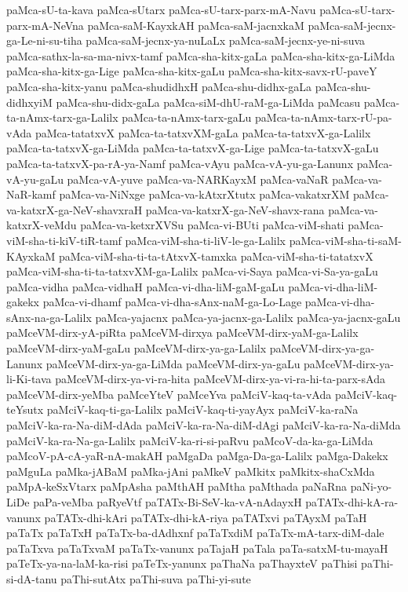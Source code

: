 {paMca-sU-ta-kava
paMca-sUtarx
paMca-sU-tarx-parx-mA-Navu
paMca-sU-tarx-parx-mA-NeVna
paMca-saM-KayxkAH
paMca-saM-jacnxkaM
paMca-saM-jecnx-ga-Le-ni-su-tiha
paMca-saM-jecnx-ya-nuLaLx
paMca-saM-jecnx-ye-ni-suva
paMca-sathx-la-sa-ma-nivx-tamf
paMca-sha-kitx-gaLa
paMca-sha-kitx-ga-LiMda
paMca-sha-kitx-ga-Lige
paMca-sha-kitx-gaLu
paMca-sha-kitx-savx-rU-paveY
paMca-sha-kitx-yanu
paMca-shudidhxH
paMca-shu-didhx-gaLa
paMca-shu-didhxyiM
paMca-shu-didx-gaLa
paMca-siM-dhU-raM-ga-LiMda
paMcasu
paMca-ta-nAmx-tarx-ga-Lalilx
paMca-ta-nAmx-tarx-gaLu
paMca-ta-nAmx-tarx-rU-pa-vAda
paMca-tatatxvX
paMca-ta-tatxvXM-gaLa
paMca-ta-tatxvX-ga-Lalilx
paMca-ta-tatxvX-ga-LiMda
paMca-ta-tatxvX-ga-Lige
paMca-ta-tatxvX-gaLu
paMca-ta-tatxvX-pa-rA-ya-Namf
paMca-vAyu
paMca-vA-yu-ga-Lanunx
paMca-vA-yu-gaLu
paMca-vA-yuve
paMca-va-NARKayxM
paMca-vaNaR
paMca-va-NaR-kamf
paMca-va-NiNxge
paMca-va-kAtxrXtutx
paMca-vakatxrXM
paMca-va-katxrX-ga-NeV-shavxraH
paMca-va-katxrX-ga-NeV-shavx-rana
paMca-va-katxrX-veMdu
paMca-va-ketxrXVSu
paMca-vi-BUti
paMca-viM-shati
paMca-viM-sha-ti-kiV-tiR-tamf
paMca-viM-sha-ti-liV-le-ga-Lalilx
paMca-viM-sha-ti-saM-KAyxkaM
paMca-viM-sha-ti-ta-tAtxvX-tamxka
paMca-viM-sha-ti-tatatxvX
paMca-viM-sha-ti-ta-tatxvXM-ga-Lalilx
paMca-vi-Saya
paMca-vi-Sa-ya-gaLu
paMca-vidha
paMca-vidhaH
paMca-vi-dha-liM-gaM-gaLu
paMca-vi-dha-liM-gakekx
paMca-vi-dhamf
paMca-vi-dha-sAnx-naM-ga-Lo-Lage
paMca-vi-dha-sAnx-na-ga-Lalilx
paMca-yajacnx
paMca-ya-jacnx-ga-Lalilx
paMca-ya-jacnx-gaLu
paMceVM-dirx-yA-piRta
paMceVM-dirxya
paMceVM-dirx-yaM-ga-Lalilx
paMceVM-dirx-yaM-gaLu
paMceVM-dirx-ya-ga-Lalilx
paMceVM-dirx-ya-ga-Lanunx
paMceVM-dirx-ya-ga-LiMda
paMceVM-dirx-ya-gaLu
paMceVM-dirx-ya-li-Ki-tava
paMceVM-dirx-ya-vi-ra-hita
paMceVM-dirx-ya-vi-ra-hi-ta-parx-sAda
paMceVM-dirx-yeMba
paMceYteV
paMceYva
paMciV-kaq-ta-vAda
paMciV-kaq-teYsutx
paMciV-kaq-ti-ga-Lalilx
paMciV-kaq-ti-yayAyx
paMciV-ka-raNa
paMciV-ka-ra-Na-diM-dAda
paMciV-ka-ra-Na-diM-dAgi
paMciV-ka-ra-Na-diMda
paMciV-ka-ra-Na-ga-Lalilx
paMciV-ka-ri-si-paRvu
paMcoV-da-ka-ga-LiMda
paMcoV-pA-cA-yaR-nA-makAH
paMgaDa
paMga-Da-ga-Lalilx
paMga-Dakekx
paMguLa
paMka-jABaM
paMka-jAni
paMkeV
paMkitx
paMkitx-shaCxMda
paMpA-keSxVtarx
paMpAsha
paMthAH
paMtha
paMthada
paNaRna
paNi-yo-LiDe
paPa-veMba
paRyeVtf
paTATx-Bi-SeV-ka-vA-nAdayxH
paTATx-dhi-kA-ra-vanunx
paTATx-dhi-kAri
paTATx-dhi-kA-riya
paTATxvi
paTAyxM
paTaH
paTaTx
paTaTxH
paTaTx-ba-dAdhxnf
paTaTxdiM
paTaTx-mA-tarx-diM-dale
paTaTxva
paTaTxvaM
paTaTx-vanunx
paTajaH
paTala
paTa-satxM-tu-mayaH
paTeTx-ya-na-laM-ka-risi
paTeTx-yanunx
paThaNa
paThayxteV
paThisi
paThi-si-dA-tanu
paThi-sutAtx
paThi-suva
paThi-yi-sute
}
